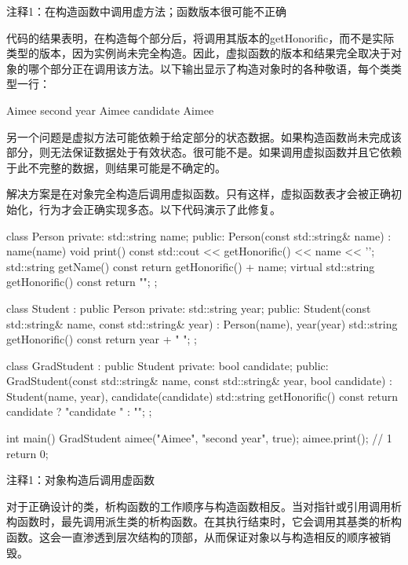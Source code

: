 {\footnotesize
注释1：在构造函数中调用虚方法；函数版本很可能不正确
}


代码的结果表明，在构造每个部分后，将调用其版本的getHonorific，而不是实际类型的版本，因为实例尚未完全构造。因此，虚拟函数的版本和结果完全取决于对象的哪个部分正在调用该方法。以下输出显示了构造对象时的各种敬语，每个类类型一行：

\begin{shell}
Aimee
second year Aimee
candidate Aimee
\end{shell}

另一个问题是虚拟方法可能依赖于给定部分的状态数据。如果构造函数尚未完成该部分，则无法保证数据处于有效状态。很可能不是。如果调用虚拟函数并且它依赖于此不完整的数据，则结果可能是不确定的。


解决方案是在对象完全构造后调用虚拟函数。只有这样，虚拟函数表才会被正确初始化，行为才会正确实现多态。以下代码演示了此修复。


\begin{cpp}
class Person {
private:
  std::string name;
public:
  Person(const std::string& name) : name(name) {}
  void print() const { std::cout << getHonorific() << name << '\n'; }
  std::string getName() const { return getHonorific() + name; }
  virtual std::string getHonorific() const { return ""; }
};

class Student : public Person {
private:
  std::string year;
public:
  Student(const std::string& name, const std::string& year) : Person(name), year(year) {}
  std::string getHonorific() const { return year + " "; }
};

class GradStudent : public Student {
private:
  bool candidate;
public:
  GradStudent(const std::string& name, const std::string& year,
      bool candidate) :
    Student(name, year), candidate(candidate) {}
  std::string getHonorific() const { return candidate ? "candidate " : ""; }
};

int main() {
  GradStudent aimee("Aimee", "second year", true);
  aimee.print(); // 1
  return 0;
}
\end{cpp}

{\footnotesize
注释1：对象构造后调用虚函数
}

对于正确设计的类，析构函数的工作顺序与构造函数相反。当对指针或引用调用析构函数时，最先调用派生类的析构函数。在其执行结束时，它会调用其基类的析构函数。这会一直渗透到层次结构的顶部，从而保证对象以与构造相反的顺序被销毁。


